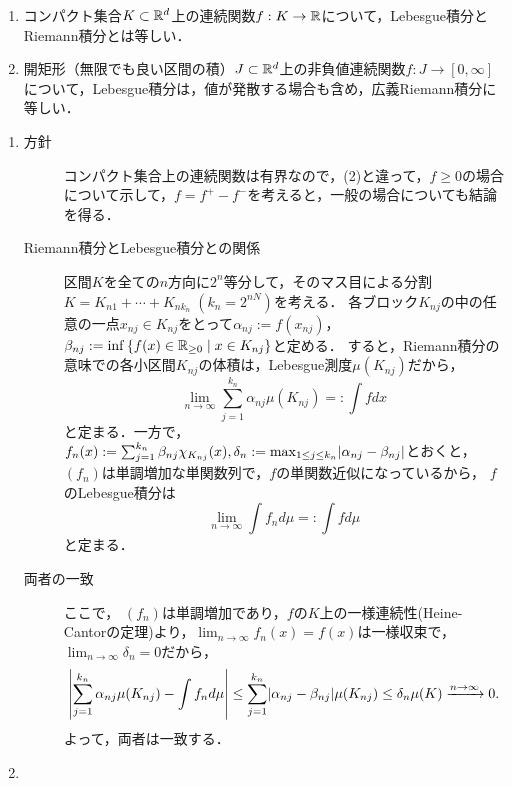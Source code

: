 \documentclass[uplatex, dvipdfmx]{jsreport}
\begin{document}
\begin{theorem}[連続関数の積分]\mbox{}\label{thm-Lebesgue-integral-of-continuous-function}
    \begin{enumerate}
        \item コンパクト集合$K\subset\mathbb{R}^d$上の連続関数$f:K\to\mathbb{R}$について，Lebesgue積分とRiemann積分とは等しい．
        \item 開矩形（無限でも良い区間の積）$J\subset\mathbb{R}^d$上の非負値連続関数$f:J\to[0,\infty]$について，Lebesgue積分は，値が発散する場合も含め，広義Riemann積分に等しい．
    \end{enumerate}
\end{theorem}
\begin{Proof}\mbox{}
    \begin{enumerate}
        \item \begin{description}
            \item[方針] コンパクト集合上の連続関数は有界なので，(2)と違って，$f\ge 0$の場合について示して，$f=f^+-f^-$を考えると，一般の場合についても結論を得る．
            \item[Riemann積分とLebesgue積分との関係]
            区間$K$を全ての$n$方向に$2^n$等分して，そのマス目による分割$K=K_{n1}+\cdots+K_{nk_n}\;(k_n=2^{nN})$を考える．
            各ブロック$K_{nj}$の中の任意の一点$x_{nj}\in K_{nj}$をとって$\alpha_{nj}:=f(x_{nj})$，$\beta_{nj}:=\inf\left\{f(x)\in\mathbb{R}_{\ge0}\mid x\in K_{nj}\right\}$と定める．
            すると，Riemann積分の意味での各小区間$K_{nj}$の体積は，Lebesgue測度$\mu(K_{nj})$だから，
            \[\lim_{n\to\infty}\sum_{j=1}^{k_n}\alpha_{nj}\mu(K_{nj})=:\int fdx\]
            と定まる．一方で，
            $f_n(x):=\sum_{j=1}^{k_n}\beta_{nj}\chi_{K_{nj}}(x),\delta_n:=\max_{1\le j\le k_n}\lvert\alpha_{nj}-\beta_{nj}\rvert$とおくと，
            $(f_n)$は単調増加な単関数列で，$f$の単関数近似になっているから，
            $f$のLebesgue積分は
            \[\lim_{n\to\infty}\int f_nd\mu=:\int fd\mu\]
            と定まる．
            \item[両者の一致]
            ここで，
            $(f_n)$は単調増加であり，$f$の$K$上の一様連続性(Heine-Cantorの定理)より，$\lim_{n\to\infty}f_n(x)=f(x)$は一様収束で，$\lim_{n\to\infty}\delta_n=0$だから，
            \[\left|\sum_{j=1}^{k_n}\alpha_{nj}\mu(K_{nj})-\int f_nd\mu\right|\le\sum_{j=1}^{k_n}\lvert\alpha_{nj}-\beta_{nj}\rvert\mu(K_{nj})\le\delta_n\mu(K)\xrightarrow{n\to\infty}0.\]
            よって，両者は一致する．
        \end{description}
        \item \begin{description}

\end{description}
\end{enumerate}
\end{Proof}
\end{document}
